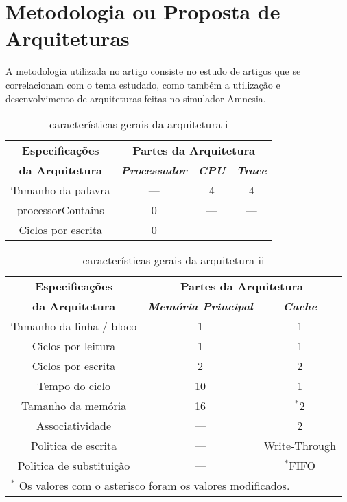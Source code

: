 \documentclass[conference]{IEEEtran}
\begin{document}
\section{Metodologia ou Proposta de Arquiteturas}

A metodologia utilizada no artigo consiste no estudo de artigos que se correlacionam com o tema estudado, 
como também a utilização e desenvolvimento de arquiteturas feitas no simulador Amnesia.

\begin{table}[H]
  \caption{características gerais da arquitetura i}
  \begin{center}
      \begin{tabular}{|c|c|c|c|}
          \hline
          \textbf{Especificações} & \multicolumn{3}{|c|}{\textbf{Partes da Arquitetura}} \\
          \cline{2-4} 
          \textbf{da Arquitetura} & \textbf{\textit{Processador}}& \textbf{\textit{CPU}}& \textbf{\textit{Trace}} \\
          \hline
          Tamanho da palavra & --- & 4 & 4 \\
          \hline
          processorContains & 0 & --- & --- \\
          \hline
          Ciclos por escrita & 0 & --- & --- \\
          \hline
      \end{tabular}
      \label{tab1}
  \end{center}
\end{table}

\begin{table}[H]
  \caption{características gerais da arquitetura ii}
  \begin{center}
      \begin{tabular}{|c|c|c|}
          \hline
          \textbf{Especificações} & \multicolumn{2}{|c|}{\textbf{Partes da Arquitetura}} \\
          \cline{2-3} 
          \textbf{da Arquitetura} & \textbf{\textit{Memória Principal}}& \textbf{\textit{Cache}} \\
          \hline
          Tamanho da linha / bloco & 1 & 1  \\
          \hline
          Ciclos por leitura & 1 & 1  \\
          \hline
          Ciclos por escrita & 2 & 2  \\
          \hline
          Tempo do ciclo & 10 & 1  \\
          \hline
          Tamanho da memória & 16 & {$^{\mathrm{*}}$}2  \\
          \hline
          Associatividade & --- & 2  \\
          \hline
          Politica de escrita & --- & Write-Through  \\
          \hline
          Politica de substituição & --- & {$^{\mathrm{*}}$}FIFO  \\
          \hline
          \multicolumn{3}{l}{$^{\mathrm{*}}$ Os valores com o asterisco foram os valores modificados.}
      \end{tabular}
      \label{tab1}
  \end{center}
\end{table}
\end{document}
